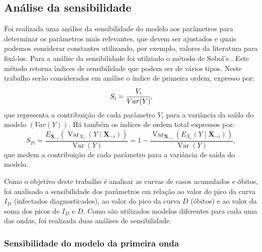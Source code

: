 \documentclass[12pt]{article}
\begin{document}
\subsection{Análise da sensibilidade}

Foi realizada uma análise da sensibilidade do modelo aos parâmetros para determinar os parâmetros mais relevantes, que devem ser ajustados e quais podemos considerar constantes utilizando, por exemplo, valores da literatura para fixá-los. Para a análise da sensibilidade foi utilziado o método de Sobol's \cite{saltelli2010variance}. Este método retorna índices de sensibilidade que podem ser de vários tipos. Neste trabalho serão considerados em análise o índice de primeira ordem, expresso por:
$$S_i = \cfrac{V_i}{Var(Y)},$$
que representa a contribuição de cada parâmetro $V_i$ para a variância da saída do modelo $(Var(Y))$. Há também os índices de ordem total expressos por:
$$S_{Ti}={\frac {E_{{\textbf {X}}_{\sim i}}\left(\operatorname {Var} _{X_{i}}(Y\mid \mathbf {X} _{\sim i})\right)}{\operatorname {Var} (Y)}}=1-{\frac {\operatorname {Var} _{{\textbf {X}}_{\sim i}}\left(E_{X_{i}}(Y\mid \mathbf {X} _{\sim i})\right)}{\operatorname {Var} (Y)}},$$
que medem a contribuição de cada parâmetro para a variância de saída do modelo.

Como o objetivo deste trabalho é analisar as curvas de casos acumulados e óbitos, foi analisado a sensibilidade dos parâmetros em relação ao valor do pico da curva $I_D$ (infectados diagnosticados), ao valor do pico da curva $D$ (óbitos) e ao valor da soma dos picos de $I_D$ e $D$. Como são utilizados modelos diferentes para cada uma das ondas, foi realizada duas análises de sensibilidade.

\subsubsection{ Sensibilidade do modelo da primeira onda}
\end{document}
